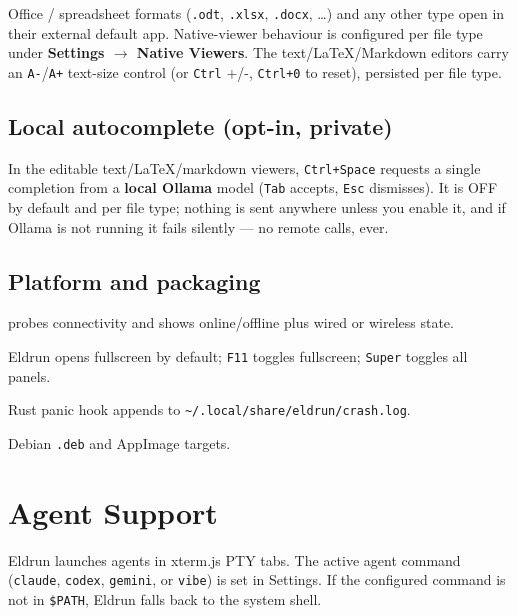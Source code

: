 \documentclass[11pt,a4paper]{article}
\newcommand{\code}[1]{\texttt{#1}}
\begin{document}
Office / spreadsheet formats (\code{.odt}, \code{.xlsx}, \code{.docx}, \dots)
and any other type open in their external default app. Native-viewer behaviour
is configured per file type under \textbf{Settings $\rightarrow$ Native
Viewers}. The text/LaTeX/Markdown editors carry an \code{A-}/\code{A+}
text-size control (or \code{Ctrl} +/-, \code{Ctrl+0} to reset), persisted per
file type.

\subsection{Local autocomplete (opt-in, private)}

In the editable text/LaTeX/markdown viewers, \code{Ctrl+Space} requests a single
completion from a \textbf{local Ollama} model (\code{Tab} accepts, \code{Esc}
dismisses). It is OFF by default and per file type; nothing is sent anywhere
unless you enable it, and if Ollama is not running it fails silently --- no
remote calls, ever.

\subsection{Platform and packaging}

\begin{description}[leftmargin=1.2em,style=nextline]
  \item[Network indicator] probes connectivity and shows online/offline plus
  wired or wireless state.
  \item[Keyboard shortcuts] Eldrun opens fullscreen by default; \code{F11}
  toggles fullscreen; \code{Super} toggles all panels.
  \item[Crash logging] Rust panic hook appends to
  \code{\textasciitilde/.local/share/eldrun/crash.log}.
  \item[Packaging] Debian \code{.deb} and AppImage targets.
\end{description}

\section{Agent Support}

Eldrun launches agents in xterm.js PTY tabs. The active agent command
(\code{claude}, \code{codex}, \code{gemini}, or \code{vibe}) is set in Settings.
If the configured command is not in \code{\$PATH}, Eldrun falls back to the
system shell.
\end{document}
